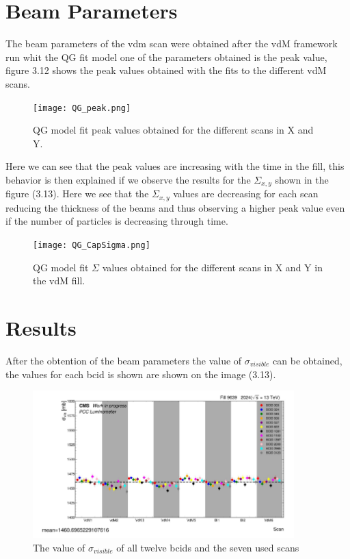 \section{Beam Parameters}

The beam parameters of the vdm scan were obtained after the vdM framework run whit the QG fit model one of the parameters obtained is the peak value, figure 3.12 shows the peak values obtained with the fits to the different vdM scans.

\begin{figure}[H]
    \centering
    \texttt{[image: QG\_peak.png]}
    \caption{QG model fit peak values obtained for the different scans in X and Y.}
    \label{fig:QGpeak}
\end{figure}

Here we can see that the peak values are increasing with the time in the fill, this behavior is then explained if we observe the results for the $\Sigma_{x, y}$ shown in the figure (3.13). Here we see that the $\Sigma_{x, y}$ values are decreasing for each scan reducing the thickness of the beams and thus observing a higher peak value even if the number of particles is decreasing through time. 

\begin{figure}[H]
    \centering
    \texttt{[image: QG\_CapSigma.png]}
    \caption{QG model fit $\Sigma$ values obtained for the different scans in X and Y in the vdM fill.}
    \label{fig:QGcapsigma}
\end{figure}

\section{Results}

After the obtention of the beam parameters  the value of $\sigma_{visible}$ can be obtained, the values for each bcid is shown are shown on the image (3.13).

\begin{figure}[H]
    \centering
    \includegraphics[width=0.9\textwidth]{sigbcid.png}
    \caption{The value of $\sigma_{visible}$ of all twelve bcids and the seven used scans}
    \label{fig:sigbcid}
\end{figure}

